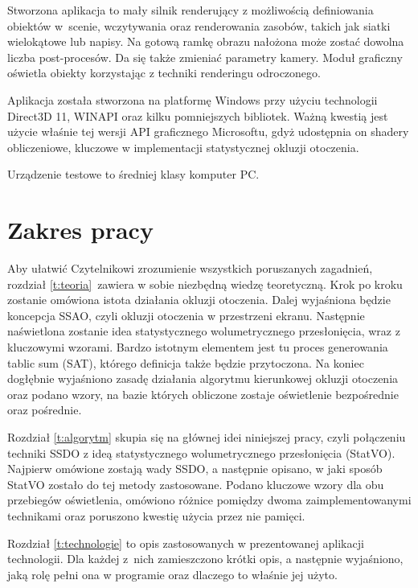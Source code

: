 	Stworzona aplikacja to mały silnik renderujący z możliwością definiowania obiektów w~scenie, wczytywania oraz renderowania zasobów, takich jak siatki wielokątowe lub napisy. Na gotową ramkę obrazu nałożona może zostać dowolna liczba post-procesów. Da się także zmieniać parametry kamery. Moduł graficzny oświetla obiekty korzystając z techniki renderingu odroczonego.
	
	Aplikacja została stworzona na platformę Windows przy użyciu technologii Direct3D 11, WINAPI oraz kilku pomniejszych bibliotek. Ważną kwestią jest użycie właśnie tej wersji API graficznego Microsoftu, gdyż udostępnia on shadery obliczeniowe, kluczowe w implementacji statystycznej okluzji otoczenia.
	
	Urządzenie testowe to średniej klasy komputer PC.
	
	\section{Zakres pracy}
	\label{t:wprowadzenie:zakres}
	
	
	Aby ułatwić Czytelnikowi zrozumienie wszystkich poruszanych zagadnień, rozdział \ref{t:teoria}~zawiera w sobie niezbędną wiedzę teoretyczną. Krok po kroku zostanie omówiona istota działania okluzji otoczenia. Dalej wyjaśniona będzie koncepcja SSAO, czyli okluzji otoczenia w przestrzeni ekranu. Następnie naświetlona zostanie idea statystycznego wolumetrycznego przesłonięcia, wraz z kluczowymi wzorami. Bardzo istotnym elementem jest tu proces generowania tablic sum (SAT), którego definicja także będzie przytoczona. Na koniec dogłębnie wyjaśniono zasadę działania algorytmu kierunkowej okluzji otoczenia oraz podano wzory, na bazie których obliczone zostaje oświetlenie bezpośrednie oraz pośrednie.
	
	Rozdział \ref{t:algorytm} skupia się na głównej idei niniejszej pracy, czyli połączeniu techniki SSDO z ideą statystycznego wolumetrycznego przesłonięcia (StatVO). Najpierw omówione zostają wady SSDO, a następnie opisano, w jaki sposób StatVO zostało do tej metody zastosowane. Podano kluczowe wzory dla obu przebiegów oświetlenia, omówiono różnice pomiędzy dwoma zaimplementowanymi technikami oraz poruszono kwestię użycia przez nie pamięci.
	
	Rozdział \ref{t:technologie} to opis zastosowanych w prezentowanej aplikacji technologii. Dla każdej z~nich zamieszczono krótki opis, a następnie wyjaśniono, jaką rolę pełni ona w programie oraz dlaczego to właśnie jej użyto.
	
